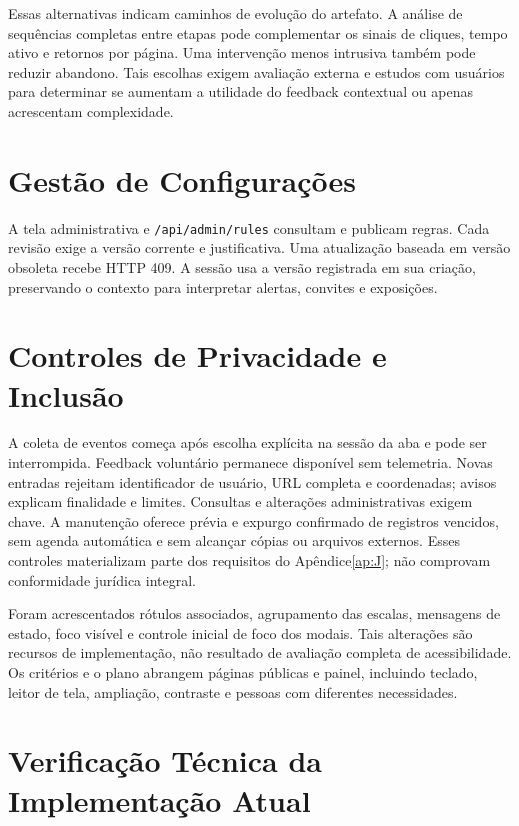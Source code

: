 Essas alternativas indicam caminhos de evolução do artefato. A análise de sequências completas entre etapas pode complementar os sinais de cliques, tempo ativo e retornos por página. Uma intervenção menos intrusiva também pode reduzir abandono. Tais escolhas exigem avaliação externa e estudos com usuários para determinar se aumentam a utilidade do feedback contextual ou apenas acrescentam complexidade.

\section{Gestão de Configurações}
\label{sec:4.17}

A tela administrativa e \texttt{/\allowbreak{}api/\allowbreak{}admin/\allowbreak{}rules} consultam e publicam regras. Cada revisão exige a versão corrente e justificativa. Uma atualização baseada em versão obsoleta recebe HTTP 409. A sessão usa a versão registrada em sua criação, preservando o contexto para interpretar alertas, convites e exposições.

\section{Controles de Privacidade e Inclusão}
\label{sec:4.18}

A coleta de eventos começa após escolha explícita na sessão da aba e pode ser interrompida. Feedback voluntário permanece disponível sem telemetria. Novas entradas rejeitam identificador de usuário, URL completa e coordenadas; avisos explicam finalidade e limites. Consultas e alterações administrativas exigem chave. A manutenção oferece prévia e expurgo confirmado de registros vencidos, sem agenda automática e sem alcançar cópias ou arquivos externos. Esses controles materializam parte dos requisitos do Apêndice\nobreakspace{}\ref{ap:J}; não comprovam conformidade jurídica integral.

Foram acrescentados rótulos associados, agrupamento das escalas, mensagens de estado, foco visível e controle inicial de foco dos modais. Tais alterações são recursos de implementação, não resultado de avaliação completa de acessibilidade. Os critérios e o plano abrangem páginas públicas e painel, incluindo teclado, leitor de tela, ampliação, contraste e pessoas com diferentes necessidades.

\section{Verificação Técnica da Implementação Atual}
\label{sec:4.19}

